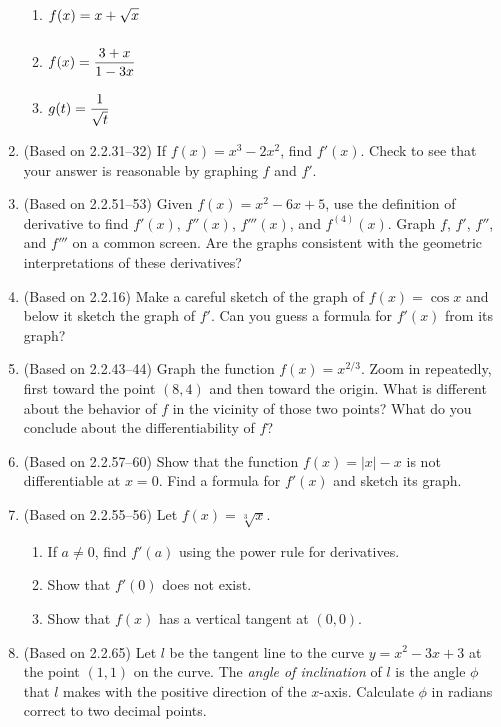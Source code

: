 \documentclass{article}
\newcommand{\ds}{\displaystyle}
\begin{document}
\begin{enumerate}
\begin{multicols}{4}
\begin{enumerate}
  \item $\ds f(x)=x+\sqrt{x} \vphantom{\frac{3}{\sqrt{t}}}$
  \item $\ds f(x)=\frac{3+x}{1-3x} \vphantom{\frac{3}{\sqrt{t}}}$
  \item $\ds g(t)=\frac{1}{\sqrt{t}} \vphantom{\frac{3}{\sqrt{t}}}$
  \end{enumerate}
  \end{multicols}
\item (Based on 2.2.31--32)
  If $\ds f(x) = x^3-2x^2$, find $\ds f'(x)$.  Check to see that your answer
  is reasonable by graphing $\ds f$ and $\ds f'$.
\item (Based on 2.2.51--53)
  Given $\ds f(x) = x^2-6x+5$, use the definition of derivative to find
  $\ds f'(x)$, $\ds f''(x)$, $\ds f'''(x)$, and $\ds f^{(4)}(x)$.  Graph
  $f$, $f'$, $f''$, and $f'''$ on a common screen.  Are the graphs consistent
  with the geometric interpretations of these derivatives?
\item (Based on 2.2.16)
  Make a careful sketch of the graph of $f(x)=\cos x$ and below it sketch the
  graph of $\ds f'$.  Can you guess a formula for $f'(x)$ from its graph?
\item (Based on 2.2.43--44)
  Graph the function $\ds f(x)=x^{2/3}$.  Zoom in repeatedly, first toward
  the point $\ds (8,4)$ and then toward the origin.  What is different about the
  behavior of $\ds f$ in the vicinity of those two points?  What do you conclude
  about the differentiability of $\ds f$?
\item (Based on 2.2.57--60)
  Show that the function $\ds f(x)=|x|-x$ is not differentiable at $\ds x=0$.
  Find a formula for $\ds f'(x)$ and sketch its graph.
\item (Based on 2.2.55--56)
  Let $f(x)=\sqrt[3]{x}$.
  \begin{enumerate}
  \item If $a\ne 0$, find $f'(a)$ using the power rule for derivatives.
  \item Show that $f'(0)$ does not exist.
  \item Show that $f(x)$ has a vertical tangent at $(0,0)$.
  \end{enumerate}
\item (Based on 2.2.65)
  Let $l$ be the tangent line to the curve $\ds y=x^2-3x+3$ at the point 
  $\ds (1,1)$ on the curve.  The \textit{angle of inclination} of $l$ is
  the angle $\phi$ that $l$ makes with the positive direction of the $x$-axis.
  Calculate $\phi$ in radians correct to two decimal points.
\end{enumerate}
\end{document}
